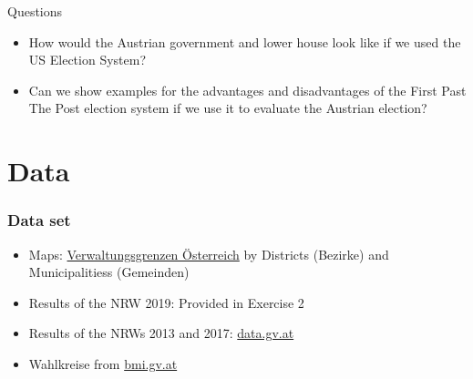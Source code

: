 \documentclass{beamer}
\begin{document}
\begin{frame}{Questions}
    \begin{itemize}
        \item How would the Austrian government and lower house look like if we used the US Election System?
        \item Can we show examples for the advantages and disadvantages of the First Past The Post election system if we use it to evaluate the Austrian election?
    \end{itemize}
\end{frame}

\section{Data} 
\begin{frame}
\frametitle{Data set}
\begin{itemize}
\item Maps: \href{https://www.data.gv.at}{Verwaltungsgrenzen Österreich} by Districts (Bezirke) and Municipalitiess (Gemeinden)
\item Results of the NRW 2019: Provided in Exercise 2
\item Results of the NRWs 2013 and 2017: \href{https://www.data.gv.at}{data.gv.at}
\item Wahlkreise from \href{https://www.bmi.gv.at/412/Nationalratswahlen/Wahlkreiseinteilung.aspx}{bmi.gv.at}
\end{itemize}

\end{frame}
\end{document}
